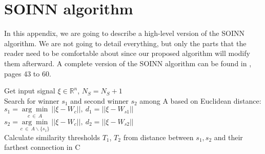 \appendix
\chapter{SOINN algorithm}
\label{chap:soinn_original_algo}
In this appendix, we are going to describe a high-level version of the SOINN algorithm. We are not going to detail everything, but only the parts that the reader need to be comfortable about since our proposed algorithm will modify them afterward. A complete version of the SOINN algorithm can be found in \cite{SOINN}, pages 43 to 60.

\begin{algorithm}[H]
    Get input signal $\xi \in \mathbb{R}^n$, $N_S = N_S + 1$ \\
    Search for winner $s_1$ and second winner $s_2$ among A based on Euclidean distance: \\
    $s_1 = \underset{c ~\in ~A}{\arg\min}~||\xi - W_{c}||, ~d_1 = ||\xi - W_{s1}||$ \\
    $s_2 = \underset{c ~\in ~A\backslash\{s_1\}}{\arg\min}~||\xi - W_{c}||, ~d_2 = ||\xi - W_{s2}||$ \\
    Calculate similarity thresholds $T_1$, $T_2$ from distance between $s_1,s_2$ and their farthest connection in C
\end{algorithm}

